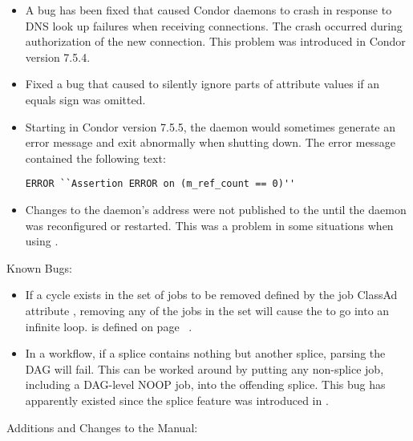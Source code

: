 \begin{itemize}
\item A bug has been fixed that caused Condor daemons to crash in
  response to DNS look up failures when receiving connections.  The
  crash occurred during authorization of the new connection.  
  This problem was introduced in Condor version 7.5.4.

\item Fixed a bug that caused  to silently ignore parts
of attribute values if an equals sign was omitted.

\item Starting in Condor version 7.5.5, the  daemon would
  sometimes generate an error message and exit abnormally when
  shutting down.  The error message contained the following text:
\begin{verbatim}
ERROR ``Assertion ERROR on (m_ref_count == 0)''
\end{verbatim}

\item Changes to the  daemon's address were 
  not published to the  until the  daemon
  was reconfigured or restarted.  
  This was a problem in some situations when using .

\end{itemize}

\noindent Known Bugs:

\begin{itemize}

\item If a cycle exists in the set of jobs to be removed defined by 
the job ClassAd attribute ,
removing any of the jobs in the set will cause the
 to go into an infinite loop.
 is defined on
page ~\pageref{attribute-OtherJobRemoveRequirements}.

\item In a  workflow, if a splice contains nothing but
another splice, parsing the DAG will fail.  This can be worked around
by putting any non-splice job, including a DAG-level NOOP job,
into the offending splice.  
This bug has apparently existed since the splice
feature was introduced in .


\end{itemize}

\noindent Additions and Changes to the Manual:

